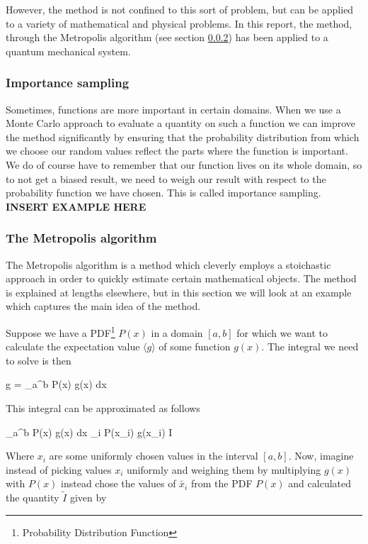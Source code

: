 However, the method is not confined to this sort of problem, but can be applied to a variety of mathematical and physical problems. 
In this report, the method, through the Metropolis algorithm (see section \ref{sec:theory_metropolis}) has been applied to a quantum mechanical system.

\subsubsection{Importance sampling}

Sometimes, functions are more important in certain domains.
When we use a Monte Carlo approach to evaluate a quantity on such a function we can improve the method significantly by ensuring that the probability distribution from which we choose our random values reflect the parts where the function is important.
We do of course have to remember that our function lives on its whole domain, so to not get a biased result, we need to weigh our result with respect to the probability function we have chosen. 
This is called importance sampling. 
\textbf{INSERT EXAMPLE HERE}

\subsubsection{The Metropolis algorithm} \label{sec:theory_metropolis}

The Metropolis algorithm is a method which cleverly employs a stoichastic approach in order to quickly estimate certain mathematical objects.
The method is explained at lengths elsewhere\cite{lecturenotes}, but in this section we will look at an example which captures the main idea of the method.

Suppose we have a PDF\footnote{Probability Distribution Function} $P(x)$ in a domain $[a,b]$ for which we want to calculate the expectation value $\langle g \rangle$ of some function $g(x)$. 
The integral we need to solve is then 

\eqs
\langle g \rangle = \int_a^b P(x) g(x) dx 
\eqf

This integral can be approximated as follows

\eqs
\int_a^b P(x) g(x) dx \approx {} \sum_i P(x_i) g(x_i) \equiv I 
\eqf

Where $x_i$ are some uniformly chosen values in the interval $[a,b]$. 
Now, imagine instead of picking values $x_i$ uniformly and weighing them by multiplying $g(x)$ with $P(x)$ instead chose the values of $\tilde{x_i}$ from the PDF $P(x)$ and calculated the quantity $\tilde{I}$ given by

